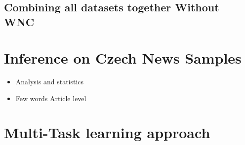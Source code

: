  \subsection{Combining all datasets together Without WNC}

 
 
 
 
\section{Inference on Czech News Samples}
\begin{itemize}
    \item Analysis and statistics
    \item Few words Article level
\end{itemize}


\section{Multi-Task learning approach}\label{mtl}